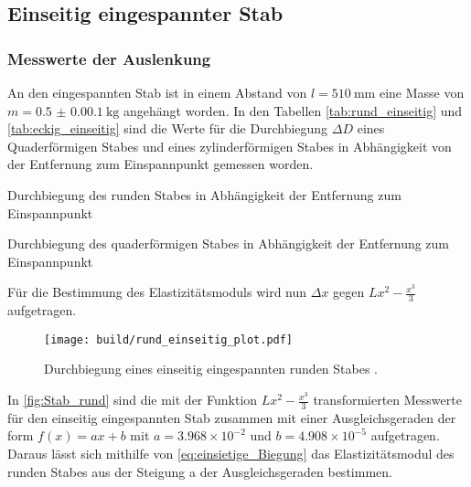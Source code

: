 \subsection{Einseitig eingespannter Stab}

\subsubsection{Messwerte der Auslenkung}

An den eingespannten Stab ist in einem Abstand von $l=\qty{510}{\milli\meter}$ eine Masse von $m=\qty{0.5(0.001)}{\kilo\gram}$
angehängt worden. In den Tabellen \ref{tab:rund_einseitig} und \ref{tab:eckig_einseitig} sind die Werte für die Durchbiegung $\Delta D$ eines
Quaderförmigen Stabes und eines zylinderförmigen Stabes in Abhängigkeit von der Entfernung zum Einspannpunkt
gemessen worden.
\begin{table}[H]
  \centering
  \begin{minipage}[b]{0.5\textwidth}
    \centering
    
    \caption{Durchbiegung des runden Stabes in Abhängigkeit der Entfernung zum Einspannpunkt}
    \label{tab:rund_einseitig}
  \end{minipage}
  \hfill
  \begin{minipage}[b]{0.5\textwidth}
    \centering
    
    \caption{Durchbiegung des quaderförmigen Stabes in Abhängigkeit der Entfernung zum Einspannpunkt}
    \label{tab:eckig_einseitig}
  \end{minipage}
\end{table}

\noindent Für die Bestimmung des Elastizitätsmoduls wird nun $\Delta x$ gegen $Lx^2 -\frac{x^3}{3}$ aufgetragen.

\begin{figure}[H]
  \centering
  \texttt{[image: build/rund\_einseitig\_plot.pdf]}
  \caption{Durchbiegung eines einseitig eingespannten runden Stabes \cite{V103}.}
  \label{fig:Stab_rund}
\end{figure}

\noindent In \autoref{fig:Stab_rund} sind die mit der Funktion $Lx^2-\frac{x^3}{3}$ transformierten Messwerte für den einseitig eingespannten Stab zusammen mit einer Ausgleichsgeraden der form $f(x)=ax+b$ mit $a=3.968\times 10^{-2}$ und $b=4.908\times 10^{-5}$ aufgetragen. Daraus lässt sich mithilfe von \autoref{eq:einsietige_Biegung} das Elastizitätsmodul des runden Stabes aus der Steigung a der Ausgleichsgeraden bestimmen.

